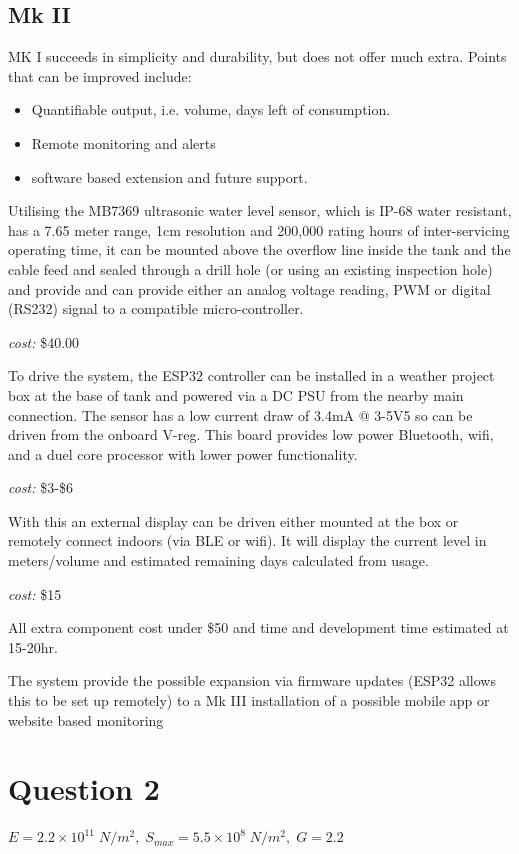 \documentclass[11pt]{article}
\begin{document}
\subsection*{Mk II}
MK I succeeds in simplicity and durability, but does not offer much extra. Points that can be improved include: 
\begin{itemize}
        \item Quantifiable output, i.e. volume, days left of consumption.
        \item Remote monitoring and alerts
        \item software based extension and future support.
\end{itemize} 
Utilising the MB7369 ultrasonic water level sensor, which is IP-68 water resistant, has a 7.65 meter range, 1cm resolution and 200,000 rating hours of inter-servicing operating time, it can be mounted above the overflow line inside the tank and the cable feed and sealed through a drill hole (or using an existing inspection hole) and provide and can provide either an analog voltage reading, PWM or digital (RS232) signal to a compatible  micro-controller.

\textit{cost:} \$40.00

To drive the system, the ESP32 controller can be installed in a weather project box at the base of tank and powered via a DC PSU from the nearby main connection. The sensor has a low current draw of 3.4mA @ 3-5V5 so can be driven from the onboard V-reg.
This board provides low power Bluetooth, wifi, and a duel core processor with lower power functionality.

\textit{cost:} \$3-\$6

With this an external display can be driven either mounted at the box or remotely connect indoors (via BLE or wifi). It will display the current level in meters/volume and estimated remaining days calculated from usage.

\textit{cost:} \$15

All extra component cost under \$50 and time and development time estimated at 15-20hr.

The system provide the possible expansion via firmware updates (ESP32 allows this to be set up remotely) to a Mk III installation of a possible mobile app or website based monitoring 

\section*{Question 2}
$E=2.2{\times}10^{11}\;N/m^2,\; S_{max} = 5.5{\times}10^8\;N/m^2,\;G=2.2$
\end{document}
